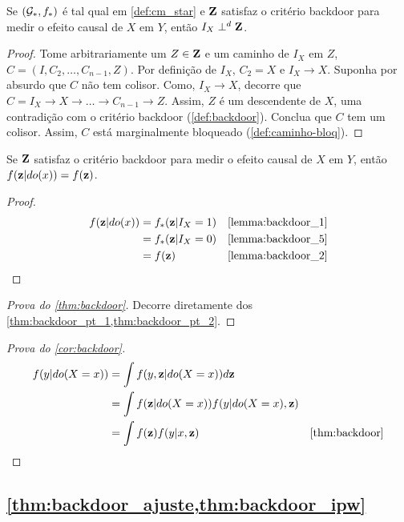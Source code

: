 \begin{lemma}
 \label{lemma:backdoor_5}
 Se $({\mathcal G}_*, f_*)$ é tal qual em \cref{def:cm_star} e
 ${\mathbf{Z}}$ satisfaz o critério backdoor para
 medir o efeito causal de $X$ em $Y$, então $I_X \perp^d {\mathbf{Z}}$.
\end{lemma}

\begin{proof}
 Tome arbitrariamente um $Z \in {\mathbf{Z}}$ e
 um caminho de $I_X$ em $Z$, 
 $C = (I, C_2, \ldots, C_{n-1}, Z)$.
 Por definição de $I_X$, $C_2 = X$ e
 $I_X \rightarrow X$. 
 Suponha por absurdo que $C$ não tem colisor.
 Como, $I_X \rightarrow X$, decorre que
 $C = I_X \rightarrow X \rightarrow \ldots 
 \rightarrow C_{n-1} \rightarrow Z$.
 Assim, $Z$ é um descendente de $X$,
 uma contradição com 
 o critério backdoor (\cref{def:backdoor}).
 Conclua que $C$ tem um colisor.
 Assim, $C$ está marginalmente bloqueado
 (\cref{def:caminho-bloq}).
\end{proof}

\begin{lemma}
 \label{thm:backdoor_pt_2}
 Se ${\mathbf{Z}}$ satisfaz o critério backdoor para
 medir o efeito causal de $X$ em $Y$, então
 $f({\mathbf{z}}|do(x)) = f({\mathbf{z}})$.
\end{lemma}

\begin{proof}
 \begin{align*}
  f(\z|do(x))
  &= f_*(\z|I_X=1)
  & \text{\cref{lemma:backdoor_1}} \\
  &= f_*(\z|I_X=0)
  & \text{\cref{lemma:backdoor_5}} \\
  &= f(\z)
  & \text{\cref{lemma:backdoor_2}}
 \end{align*}
\end{proof}

\begin{proof}[Prova do \cref{thm:backdoor}]
 Decorre diretamente dos
 \cref{thm:backdoor_pt_1,thm:backdoor_pt_2}.
\end{proof}

\begin{proof}[Prova do \cref{cor:backdoor}]
 \begin{align*}
  f(y|do(X=x))
  &= \int f(y,\z|do(X=x))d\z \\
  &= \int f(\z|do(X=x))f(y|do(X=x),\z) \\
  &= \int f(\z)f(y|x,\z)
  & \text{\cref{thm:backdoor}}
 \end{align*}
\end{proof}

\subsection{\cref{thm:backdoor_ajuste,thm:backdoor_ipw}}

